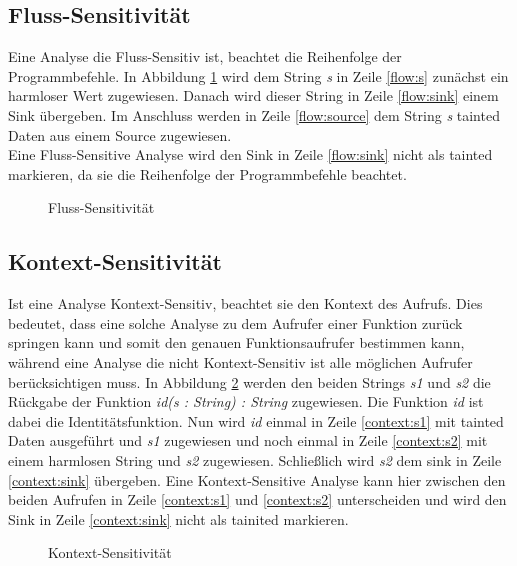 \documentclass[runningheads]{llncs}
\begin{document}
\subsection{Fluss-Sensitivität}
Eine Analyse die Fluss-Sensitiv ist, beachtet die Reihenfolge der Programmbefehle.
In Abbildung \ref{fig:fluss_code} wird dem String \emph{s} in Zeile \ref{flow:s} zunächst ein harmloser Wert zugewiesen. Danach wird dieser String in Zeile \ref{flow:sink} einem Sink übergeben. Im Anschluss werden in Zeile \ref{flow:source} dem String \emph{s} tainted Daten aus einem Source zugewiesen. \\
Eine Fluss-Sensitive Analyse wird den Sink in Zeile \ref{flow:sink} nicht als tainted markieren, da sie die Reihenfolge der Programmbefehle beachtet. 

\begin{figure}

\caption{Fluss-Sensitivität}
\label{fig:fluss_code}
\end{figure}

\subsection{Kontext-Sensitivität}
Ist eine Analyse Kontext-Sensitiv, beachtet sie den Kontext des Aufrufs. Dies bedeutet, dass eine solche Analyse zu dem Aufrufer einer Funktion zurück springen kann und somit den genauen Funktionsaufrufer bestimmen kann, während eine Analyse die nicht Kontext-Sensitiv ist alle möglichen Aufrufer berücksichtigen muss.
In Abbildung \ref{fig:context_code} werden den beiden Strings \emph{s1} und \emph{s2} die Rückgabe der Funktion \emph{id(s : String) : String} zugewiesen. Die Funktion \emph{id} ist dabei die Identitätsfunktion. Nun wird \emph{id} einmal in Zeile \ref{context:s1} mit tainted Daten ausgeführt und \emph{s1} zugewiesen und noch einmal in Zeile \ref{context:s2} mit einem harmlosen String und \emph{s2} zugewiesen. Schließlich wird \emph{s2} dem sink in Zeile \ref{context:sink} übergeben. Eine Kontext-Sensitive Analyse kann hier zwischen den beiden Aufrufen in Zeile \ref{context:s1} und \ref{context:s2} unterscheiden und wird den Sink in Zeile \ref{context:sink} nicht als tainited markieren.
 
\begin{figure}

\caption{Kontext-Sensitivität}
\label{fig:context_code}
\end{figure}
\end{document}
